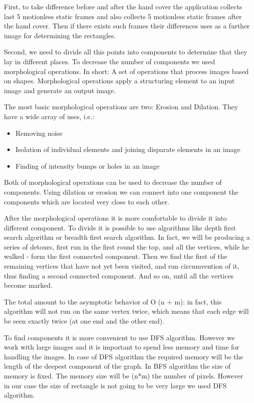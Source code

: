 First, to take difference before and after the hand cover the application collects last 5 motionless static frames and also collects 5 motionless static frames after the hand cover. Then if there exists such frames their differences uses as a further image for determining the rectangles. 

Second, we need to divide all this points into components to determine that they lay in different places. To decrease the number of components we used morphological operations. In short: A set of operations that process images based on shapes. Morphological operations apply a structuring element to an input image and generate an output image.

The most basic morphological operations are two: Erosion and Dilation. They have a wide array of uses, i.e.:
\begin{itemize}
    \item Removing noise
    \item Isolation of individual elements and joining disparate elements in an image
    \item Finding of intensity bumps or holes in an image
\end{itemize}

Both of morphological operations can be used to decrease the number of components. Using dilation or erosion we can connect into one component the components which are located very close to each other.

After the morphological operations it is more comfortable to divide it into different component. To divide it is possible to use algorithms like depth first search algorithm or breadth first search algorithm. In fact, we will be producing a series of detours, first run in the first round the top, and all the vertices, while he walked - form the first connected component. Then we find the first of the remaining vertices that have not yet been visited, and run circumvention of it, thus finding a second connected component. And so on, until all the vertices become marked.

The total amount to the asymptotic behavior of O (n + m): in fact, this algorithm will not run on the same vertex twice, which means that each edge will be seen exactly twice (at one end and the other end).\cite{Thomas}

To find components it is more convenient to use DFS algorithm. However we work with large images and it is important to spend less memory and time for handling the images. In case of DFS algorithm the required memory will be the length of the deepest component of the graph. In BFS algorithm the size of memory is fixed. The memory size will be (n*m) the number of pixels. However in our case the size of rectangle is not going to be very large we used DFS algorithm.

